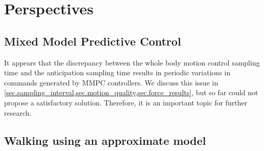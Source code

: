 \section{Perspectives}

\subsection{Mixed Model Predictive Control}

It appears that the discrepancy between the whole body motion control sampling
time and the anticipation sampling time results in periodic variations in
commands generated by \ac{MMPC} controllers. We discuss this issue in
\cref{sec.sampling_interval,sec.motion_quality,sec.force_results}, but so far
could not propose a satisfactory solution. Therefore, it is an important topic
for further research.


\subsection{Walking using an approximate model}

